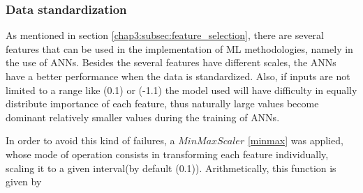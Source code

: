


\subsubsection{Data standardization}\label{chap3:subsubsec:data_standardization}

As mentioned in section \ref{chap3:subsec:feature_selection}, there are several features that can be used in the implementation of \ac{ML} methodologies, namely in the use of \ac{ANNs}. Besides the several features have different scales, the \ac{ANNs} have a better performance when the data is standardized. Also, if inputs are not limited to a range like (0.1) or (-1.1) the model used will have difficulty in equally distribute importance of each feature, thus naturally large values become dominant relatively smaller values during the training of \ac{ANNs}.

In order to avoid this kind of failures, a $MinMaxScaler$ \ref{minmax} was applied, whose mode of operation consists in transforming each feature individually, scaling it to a given interval(by default (0.1)).  Arithmetically, this function is given by

